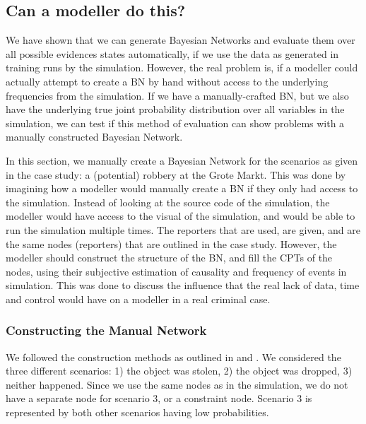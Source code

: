 \documentclass[12pt]{article}
\begin{document}
\subsection{Can a modeller do this?}
We have shown that we can generate Bayesian Networks and evaluate them over all possible evidences states automatically, if we use the data as generated in training runs by the simulation. However, the real problem is, if a modeller could actually attempt to create a BN by hand without access to the underlying frequencies from the simulation. If we have a manually-crafted BN, but we also have the underlying true joint probability distribution over all variables in the simulation, we can test if this method of evaluation can show problems with a manually constructed Bayesian Network. 

In this section, we manually create a Bayesian Network for the scenarios as given in the case study: a (potential) robbery at the Grote Markt. This was done by imagining how a modeller would manually create a BN if they only had access to the simulation. Instead of looking at the source code of the simulation, the modeller would have access to the visual of the simulation, and would be able to run the simulation multiple times. The reporters that are used, are given, and are the same nodes (reporters)  that are outlined in the case study. However, the modeller should construct the structure of the BN, and fill the CPTs of the nodes, using their subjective estimation of causality and frequency of events in simulation. This was done to discuss the influence that the real lack of data, time and control would have on a modeller in a real criminal case.  





\subsubsection{Constructing the Manual Network}

We followed the construction methods as outlined in \citep{vlek2016} and \citep{vanLeeuwen2019}. We considered the three different scenarios: 1) the object was stolen, 2) the object was dropped, 3) neither happened. Since we use the same nodes as in the simulation, we do not have a separate node for scenario 3, or a constraint node. Scenario 3 is represented by both other scenarios having low probabilities.
 
\end{document}
